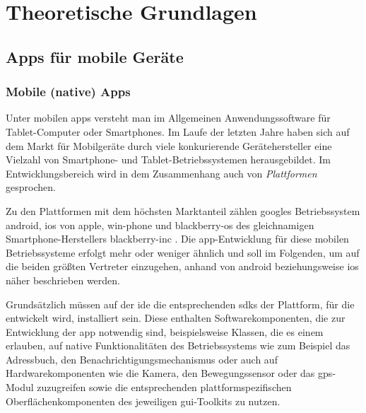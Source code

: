 \chapter{Theoretische Grundlagen}

\section{Apps für mobile Geräte}

\subsection{Mobile (native) Apps} \label{native}
Unter mobilen \glspl{app} versteht man im Allgemeinen Anwendungssoftware für Tablet-Computer oder Smartphones. 
Im Laufe der letzten Jahre haben sich auf dem Markt für Mobilgeräte durch viele konkurierende Gerätehersteller eine Vielzahl von Smartphone- und Tablet-Betriebssystemen herausgebildet.
Im Entwicklungsbereich wird in dem Zusammenhang auch von \emph{Plattformen} gesprochen.

Zu den Plattformen mit dem höchsten Marktanteil zählen \glspl{google} Betriebssystem \gls{android}, \gls{ios} von \gls{apple}, \gls{win-phone} und \gls{blackberry-os} des gleichnamigen Smartphone-Herstellers \gls{blackberry-inc} \cite{platforms-marketshare}.
Die \gls{app}-Entwicklung für diese mobilen Betriebssysteme erfolgt mehr oder weniger ähnlich und soll im Folgenden, um auf die beiden größten Vertreter einzugehen, anhand von \gls{android} beziehungsweise \gls{ios} näher beschrieben werden.

Grundsätzlich müssen auf der \gls{ide} die entsprechenden \glspl{sdk} der Plattform, für die entwickelt wird, installiert sein. 
Diese enthalten Softwarekomponenten, die zur Entwicklung der \gls{app} notwendig sind, beispielsweise Klassen, die es einem erlauben, auf native Funktionalitäten des Betriebssystems wie zum Beispiel das Adressbuch, den Benachrichtigungsmechanismus oder auch auf Hardwarekomponenten wie die Kamera, den Bewegungssensor oder das \gls{gps}-Modul zuzugreifen sowie die entsprechenden plattformspezifischen Oberflächenkomponenten des jeweiligen \gls{gui}-Toolkits zu nutzen.

